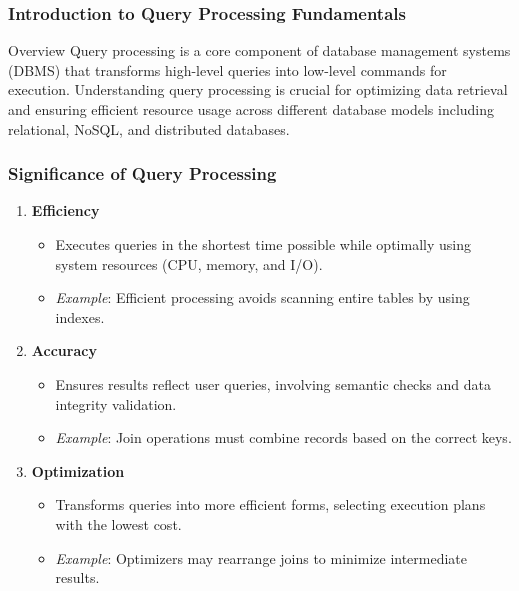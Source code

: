 \documentclass[aspectratio=169]{beamer}
\begin{document}
\frame{\titlepage}

\begin{frame}[fragile]
    \frametitle{Introduction to Query Processing Fundamentals}
    \begin{block}{Overview}
        Query processing is a core component of database management systems (DBMS) that transforms high-level queries into low-level commands for execution. 
        Understanding query processing is crucial for optimizing data retrieval and ensuring efficient resource usage across different database models including relational, NoSQL, and distributed databases.
    \end{block}
\end{frame}

\begin{frame}[fragile]
    \frametitle{Significance of Query Processing}
    \begin{enumerate}
        \item \textbf{Efficiency}
        \begin{itemize}
            \item Executes queries in the shortest time possible while optimally using system resources (CPU, memory, and I/O).
            \item \textit{Example}: Efficient processing avoids scanning entire tables by using indexes.
        \end{itemize}
        
        \item \textbf{Accuracy}
        \begin{itemize}
            \item Ensures results reflect user queries, involving semantic checks and data integrity validation.
            \item \textit{Example}: Join operations must combine records based on the correct keys.
        \end{itemize}
        
        \item \textbf{Optimization}
        \begin{itemize}
            \item Transforms queries into more efficient forms, selecting execution plans with the lowest cost.
            \item \textit{Example}: Optimizers may rearrange joins to minimize intermediate results.
        \end{itemize}
    \end{enumerate}
\end{frame}
\end{document}
